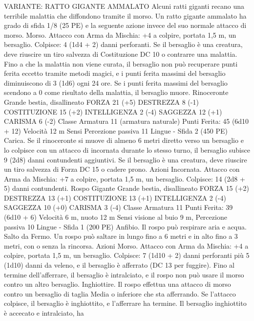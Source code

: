 \begin{multicols}{2}
VARIANTE: RATTO GIGANTE AMMALATO
Alcuni ratti giganti recano una terribile malattia che diffondono
tramite il morso. Un ratto gigante ammalato ha grado di sfida 1/8
(25 PE) e la seguente azione invece del suo normale attacco di
morso.
Morso. Attacco con Arma da Mischia: +4 a colpire, portata 1,5
m, un bersaglio.
Colpisce: 4 (1d4 + 2) danni perforanti. Se il bersaglio è una
creatura, deve riuscire un tiro salvezza di Costituzione DC 10 o
contrarre una malattia. Fino a che la malattia non viene curata, il
bersaglio non può recuperare punti ferita eccetto tramite metodi
magici, e i punti ferita massimi del bersaglio diminuiscono di 3
(1d6) ogni 24 ore. Se i punti ferita massimi del bersaglio
scendono a 0 come risultato della malattia, il bersaglio muore.
Rinoceronte
Grande bestia, disallineato
FORZA 21 (+5)
DESTREZZA 8 (-1)
COSTITUZIONE 15 (+2)
INTELLIGENZA 2 (-4)
SAGGEZZA 12 (+1)
CARISMA 6 (-2)
Classe Armatura 11 (armatura naturale)
\hspace*{0pt}\hfill{Punti Ferita}: 45 (6d10 + 12)
Velocità 12 m
Sensi Percezione passiva 11
Lingue -
Sfida 2 (450 PE)
Carica. Se il rinoceronte si muove di almeno 6 metri diretto
verso un bersaglio e lo colpisce con un attacco di incornata
durante lo stesso turno, il bersaglio subisce 9 (2d8) danni
contundenti aggiuntivi. Se il bersaglio è una creatura, deve
riuscire un tiro salvezza di Forza DC 15 o cadere prono.
Azioni
Incornata. Attacco con Arma da Mischia: +7 a colpire, portata
1,5 m, un bersaglio.
Colpisce: 14 (2d8 + 5) danni contundenti.
Rospo Gigante
Grande bestia, disallineato
FORZA 15 (+2)
DESTREZZA 13 (+1)
COSTITUZIONE 13 (+1)
INTELLIGENZA 2 (-4)
SAGGEZZA 10 (+0)
CARISMA 3 (-4)
Classe Armatura 11
\hspace*{0pt}\hfill{Punti Ferita}: 39 (6d10 + 6)
Velocità 6 m, nuoto 12 m
Sensi visione al buio 9 m, Percezione passiva 10
Lingue -
Sfida 1 (200 PE)
Anfibio. Il rospo può respirare aria e acqua.
Salto da Fermo. Un rospo può saltare in lungo fino a 6 metri e in
alto fino a 3 metri, con o senza la rincorsa.
Azioni
Morso. Attacco con Arma da Mischia: +4 a colpire, portata 1,5
m, un bersaglio.
Colpisce: 7 (1d10 + 2) danni perforanti più 5 (1d10) danni da
veleno, e il bersaglio è afferrato (DC 13 per fuggire). Fino al
termine dell’afferrare, il bersaglio è intralciato, e il rospo non
può usare il morso contro un altro bersaglio.
Inghiottire. Il rospo effettua una attacco di morso contro un
bersaglio di taglia Media o inferiore che sta afferrando. Se
l’attacco colpisce, il bersaglio è inghiottito, e l’afferrare ha
termine. Il bersaglio inghiottito è accecato e intralciato, ha

\end{multicols}
